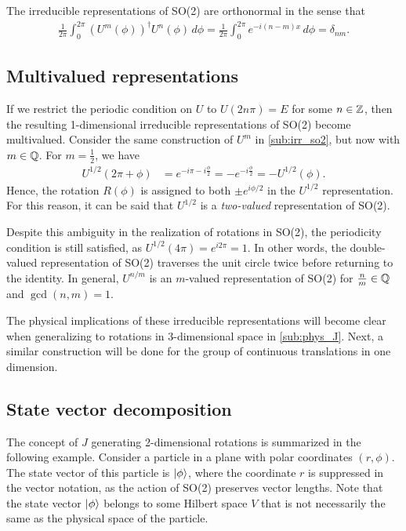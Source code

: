     The irreducible representations of SO(2) are orthonormal in the sense that
    \begin{align*}
        \frac{1}{2\pi}\int_{0}^{2\pi}{(U^m(\phi))}^\dagger U^n(\phi) \,d\phi = \frac{1}{2\pi}\int_{0}^{2\pi} e^{-i(n-m)x} \,d\phi = \delta_{nm}.
    \end{align*}

    \subsection{Multivalued representations}
    If we restrict the periodic condition on $U$ to $U(2n\pi) = E$ for some $n\in\mathbb{Z}$, then the resulting 1-dimensional irreducible representations of SO(2) become multivalued. Consider the same construction of $U^m$ in \cref{sub:irr_so2}, but now with $m\in\mathbb{Q}$. For $m=\frac{1}{2}$, we have
    \begin{align*}
        U^{1/2}(2\pi + \phi) &= e^{-i\pi -i\frac{\phi}{2}} = -e^{-i\frac{\phi}{2}} = -U^{1/2}(\phi).
    \end{align*}
    Hence, the rotation $R(\phi)$ is assigned to both $\pm e^{i\phi/2}$ in the $U^{1/2}$ representation. For this reason, it can be said that $U^{1/2}$ is a \textit{two-valued} representation of SO(2).
    
    Despite this ambiguity in the realization of rotations in SO(2), the periodicity condition is still satisfied, as $U^{1/2}(4\pi) = e^{i2\pi} = 1$. In other words, the double-valued representation of SO(2) traverses the unit circle twice before returning to the identity. In general, $U^{n/m}$ is an $m$-valued representation of SO(2) for $\frac{n}{m}\in\mathbb{Q}$ and $\gcd(n,m)=1$.
    
    The physical implications of these irreducible representations will become clear when generalizing to rotations in 3-dimensional space in \cref{sub:phys_J}. Next, a similar construction will be done for the group of continuous translations in one dimension.

    \subsection{State vector decomposition}\label{sub:SO2_decomp}
    The concept of $J$ generating 2-dimensional rotations is summarized in the following example. Consider a particle in a plane with polar coordinates $(r,\phi)$. The state vector of this particle is $\ket{\phi}$, where the coordinate $r$ is suppressed in the vector notation, as the action of SO(2) preserves vector lengths. Note that the state vector $\ket{\phi}$ belongs to some Hilbert space $V$ that is not necessarily the same as the physical space of the particle.
    
